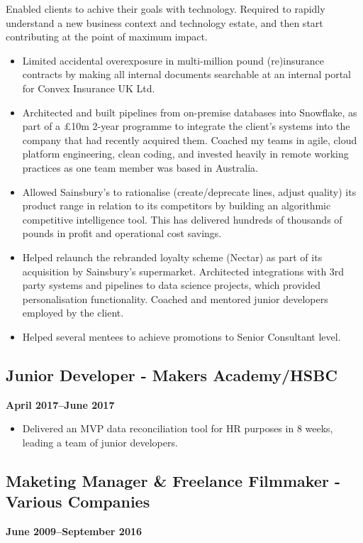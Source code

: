 \documentclass[a4paper]{scrartcl}
\begin{document}
Enabled clients to achive their goals with technology. Required to rapidly understand a new business context and technology estate, and then start contributing at the point of maximum impact.
\begin{itemize}
	\item Limited accidental overexposure in multi-million pound
	      (re)insurance contracts by making
	      all internal documents searchable at an internal portal for Convex
	      Insurance UK Ltd.
	\item Architected and built pipelines from on-premise databases into
	      Snowflake, as part of a £10m 2-year programme to integrate the
	      client's systems into the company that had recently acquired them.
	      Coached my teams in agile, cloud platform engineering, clean
	      coding,
	      and invested heavily in remote working practices as one team member
	      was based
	      in Australia.
	\item Allowed Sainsbury's to rationalise (create/deprecate lines, adjust
	      quality) its product range in relation to its competitors by
	      building an
	      algorithmic competitive intelligence tool. This has delivered
	      hundreds of
	      thousands of pounds in profit and operational cost savings.
	\item Helped relaunch the rebranded loyalty scheme (Nectar) as part of its acquisition by Sainsbury's supermarket. Architected integrations with 3rd party systems
	      and pipelines to data science projects, which provided personalisation functionality. Coached and mentored junior
	      developers
	      employed by the client.
	\item Helped several mentees to achieve
	      promotions to Senior Consultant level.
\end{itemize}

\subsection*{Junior Developer - Makers Academy/HSBC}
\textbf{April 2017--June 2017}
\begin{itemize}
	\item Delivered an MVP data reconciliation tool for HR purposes in 8
	      weeks, leading a team of junior developers.
\end{itemize}

\subsection*{Maketing Manager \& Freelance Filmmaker - Various Companies}
\textbf{June 2009--September 2016}
\end{document}
